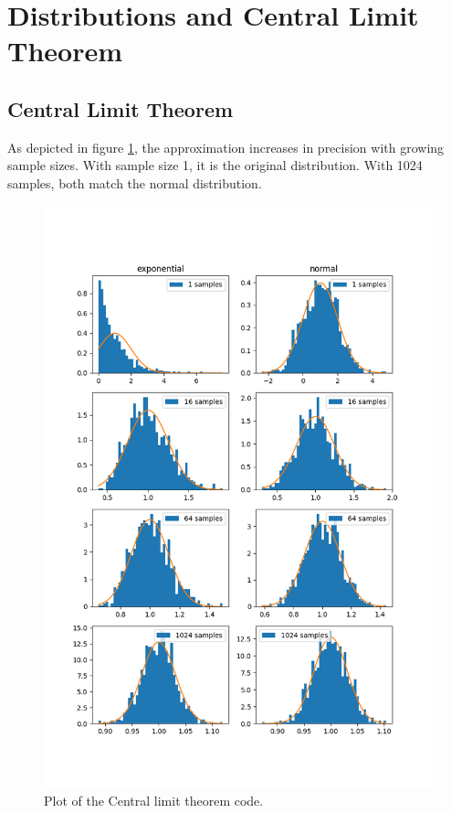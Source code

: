 \documentclass{article}
\begin{document}
\section{Distributions and Central Limit Theorem}
\subsection{Central Limit Theorem}
As depicted in figure \ref{fig:clt}, the approximation increases in precision with growing
sample sizes.
With sample size 1, it is the original distribution.
With 1024 samples, both match the normal distribution.
    \begin{figure}[H]
        \includegraphics[width=\textwidth]{clt.png}
        \caption{Plot of the Central limit theorem code.}\label{fig:clt}
    \end{figure}
\FloatBarrier
\end{document}
